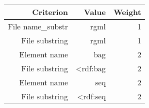\begin{tabular}{|r|r|r|}
\hline
\bf Criterion&\bf Value&\bf Weight\\
\hline
File name_substr&rgml&1\\
\hline
File substring&rgml&1\\
\hline
Element name&bag&2\\
\hline
File substring&<rdf:bag&2\\
\hline
Element name&seq&2\\
\hline
File substring&<rdf:seq&2\\
\hline
\end{tabular}
